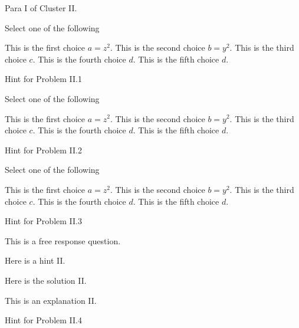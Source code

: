 \begin{cluster}[Cluster II]
\begin{gram}[200]
Para I of Cluster II.
\end{gram}

\begin{flex}
\begin{problem}
Select one of the following
\begin{pickone}
\choice This is the first choice $a = z^2$.
\choice This is the second choice $b = y^2$.
\correctchoice This is the third choice $c$.
\correctchoice This is the fourth choice $d$.
\choice This is the fifth choice $d$.
\end{pickone}

\end{problem}

\begin{hint}[210]
Hint  for Problem II.1
\end{hint}
\end{flex}

\begin{flex}
\begin{problem}
Select one of the following
\begin{pickany}
\choice This is the first choice $a = z^2$.
\choice This is the second choice $b = y^2$.
\correctchoice This is the third choice $c$.
\correctchoice This is the fourth choice $d$.
\choice This is the fifth choice $d$.
\end{pickany}

\end{problem}

\begin{hint}[220]
Hint  for Problem II.2
\end{hint}
\end{flex}
\begin{flex}
\begin{problem}
Select one of the following
\begin{pickone}
\choice This is the first choice $a = z^2$.
\choice This is the second choice $b = y^2$.
\correctchoice This is the third choice $c$.
\correctchoice This is the fourth choice $d$.
\choice This is the fifth choice $d$.
\end{pickone}

\end{problem}

\begin{hint}[230]
Hint  for Problem II.3
\end{hint}
\end{flex}

\begin{flex}
\begin{problem}
This is a free response question.

\hint
Here is a hint II.

\solution
Here is the solution II.

\explain
This is an explanation II.

\end{problem}

\begin{hint}[240]
Hint  for Problem II.4
\end{hint}
\end{flex}


\end{cluster}

